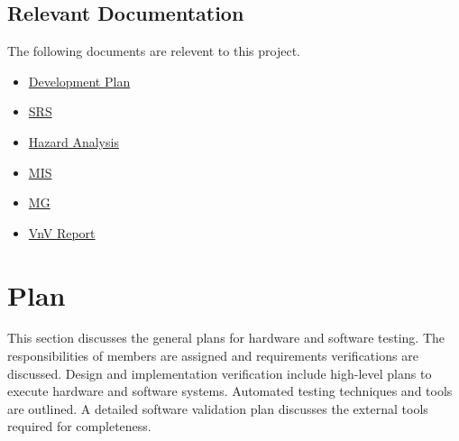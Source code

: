 \documentclass[12pt, titlepage]{article}
\begin{document}
\subsection{Relevant Documentation}
The following documents are relevent to this project.
\begin{itemize}
  \item \href{file:../DevelopmentPlan/DevelopmentPlan.pdf}{Development Plan}
  \item \href{file:../SRS/SRS.pdf}{SRS}
  \item \href{file:../HazardAnalysis/HazardAnalysis.pdf}{Hazard Analysis}
  \item \href{file:../Design/SoftDetailedDes/MIS.pdf}{MIS}
  \item \href{file:../Design/SoftArchitecture/MG.pdf}{MG}
  \item \href{file:../VnVReport/VnVReport.pdf}{VnV Report}
\end{itemize}

\section{Plan}
This section discusses the general plans for hardware and software testing. The 
responsibilities of members are assigned and requirements verifications are discussed. 
Design and implementation verification include high-level plans to execute hardware 
and software systems. Automated testing techniques and tools are outlined. 
A detailed software validation plan discusses the external tools required for 
completeness. 
\end{document}
